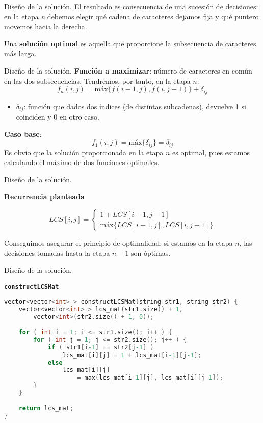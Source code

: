 \documentclass[10pt, xcolor=table]{beamer}
\begin{document}
\begin{frame}{Diseño de la solución. }
El resultado es consecuencia de una sucesión de decisiones: en la etapa \textit{n} debemos elegir qué cadena de caracteres dejamos fija y qué puntero movemos hacia la derecha. 

Una \textbf{solución optimal} es aquella que proporcione la subsecuencia de caracteres más larga.
\end{frame}

\begin{frame}{Diseño de la solución. }
\textbf{Función a maximizar}: número de caracteres en común en las dos subsecuencias. Tendremos, por tanto, en la etapa $n$:
$$
f_n(i,j) = \text{máx}\{f(i-1,j),f(i,j-1)\}+\delta_{ij}$$
\vspace{-0.8cm}
\begin{itemize}
	\item $\delta_{ij}$: función que dados dos índices (de distintas subcadenas), devuelve 1 si coinciden y 0 en otro caso.
\end{itemize}

\textbf{Caso base}:
$$
f_1(i,j) = \text{máx}\{\delta_{ij}\} = \delta_{ij}
$$
Es obvio que la solución proporcionada en la etapa $n$ es optimal, pues estamos calculando el máximo de dos funciones optimales.
\end{frame}

\begin{frame}{Diseño de la solución. }
\begin{center}
	\textbf{Recurrencia planteada}
\end{center}
$$ LCS{[i,j]}= \left\{\begin{matrix} 1+LCS[i-1,j-1] \\ \text{máx}\{LCS[i-1,j],LCS[i,j-1]\}\end{matrix}\right. $$

Conseguimos asegurar el principio de optimalidad: si estamos en la etapa $n$, las decisiones tomadas hasta la etapa $n-1$ son óptimas.
\end{frame}

\begin{frame}[fragile]{Diseño de la solución. }
\begin{center}
	\textbf{\large{\texttt{constructLCSMat}}}
\end{center}
\begin{lstlisting}[language=C]
vector<vector<int> > constructLCSMat(string str1, string str2) {
	vector<vector<int> > lcs_mat(str1.size() + 1,
		vector<int>(str2.size() + 1, 0));
	
	for ( int i = 1; i <= str1.size(); i++ ) {
		for ( int j = 1; j <= str2.size(); j++ ) {
			if ( str1[i-1] == str2[j-1] )
				lcs_mat[i][j] = 1 + lcs_mat[i-1][j-1];
			else
				lcs_mat[i][j]
					= max(lcs_mat[i-1][j], lcs_mat[i][j-1]);
		}
	}
	
	return lcs_mat;
}
\end{lstlisting}
\end{frame}
\end{document}
